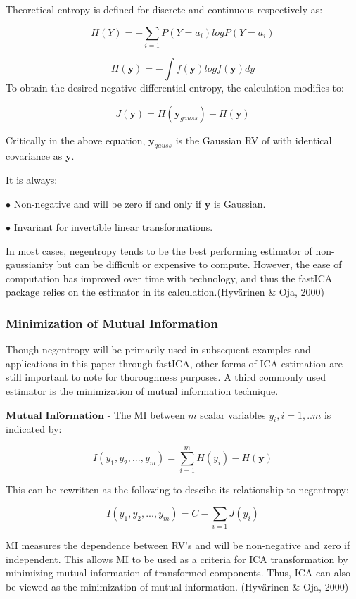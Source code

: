 \documentclass[12pt,twoside]{amherstthesis}
\begin{document}
  Theoretical entropy is defined for discrete and continuous respectively
  as:
  
  \[H(Y) = -\sum_{i=1}P(Y = a_i)log P(Y = a_i)\]
  
  \[H(\textbf{y}) = -\int f(\textbf{y})logf(\textbf{y})dy\] To obtain the
  desired negative differential entropy, the calculation modifies to:
  
  \[ J(\textbf{y}) = H(\textbf{y}_{gauss}) -H(\textbf{y})\]
  
  Critically in the above equation, \(\textbf{y}_\textit{gauss}\) is the
  Gaussian RV of with identical covariance as \(\textbf{y}\).
  
  It is always:
  
  \(\bullet\) Non-negative and will be zero if and only if \(\textbf{y}\)
  is Gaussian.
  
  \(\bullet\) Invariant for invertible linear transformations.
  
  In most cases, negentropy tends to be the best performing estimator of
  non-gaussianity but can be difficult or expensive to compute. However,
  the ease of computation has improved over time with technology, and thus
  the fastICA package relies on the estimator in its
  calculation.(Hyvärinen \& Oja, 2000)
  
  \subsubsection{Minimization of Mutual
  Information}\label{minimization-of-mutual-information}
  
  Though negentropy will be primarily used in subsequent examples and
  applications in this paper through fastICA, other forms of ICA
  estimation are still important to note for thoroughness purposes. A
  third commonly used estimator is the minimization of mutual information
  technique.
  
  \(\textbf{Mutual Information}\) - The MI between \(\textit{m}\) scalar
  variables \(y_i,\textit{i} = 1,..m\) is indicated by:
  
  \[ I(y_1,y_2,...,y_\textit{m}) = \sum_{i=1}^m H(y_\textit{i})-H(\textbf{y})\]
  
  This can be rewritten as the following to descibe its relationship to
  negentropy:
  
  \[ I(y_1,y_2,...,y_\textit{m}) = C- \sum_{i=1} J(y_\textit{i})\]
  
  MI measures the dependence between RV's and will be non-negative and
  zero if independent. This allows MI to be used as a criteria for ICA
  transformation by minimizing mutual information of transformed
  components. Thus, ICA can also be viewed as the minimization of mutual
  information. (Hyvärinen \& Oja, 2000)
  
\end{document}
